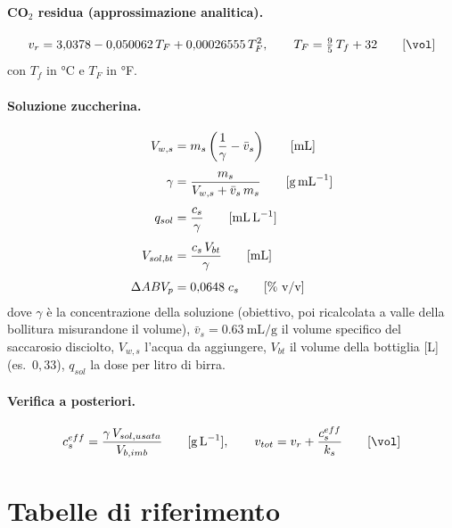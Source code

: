 \paragraph{CO$_2$ residua (approssimazione analitica).}
\begin{equation}
v_r = 3{,}0378 - 0{,}050062\,T_F + 0{,}00026555\,T_F^2, \qquad T_F = \tfrac{9}{5}\,T_f + 32 \un{\si{\vol}}
\end{equation}
con $T_f$ in \si{\celsius} e $T_F$ in \si{\degree}F.

\paragraph{Soluzione zuccherina.}
\begin{align}
V_{w,s} &= m_s\left(\frac{1}{\gamma} - \bar v_s\right) \qquad [\si{\milli\liter}] \\[4pt]
\gamma &= \frac{m_s}{V_{w,s} + \bar v_s\, m_s} \qquad [\si{\gram\per\milli\liter}] \\[4pt]
q_{sol} &= \frac{c_s}{\gamma} \qquad [\si{\milli\liter\per\liter}] \\[4pt]
V_{sol,bt} &= \frac{c_s\, V_{bt}}{\gamma} \qquad [\si{\milli\liter}] \\[4pt]
\Delta ABV_{p} &= 0{,}0648\; c_s \qquad [\si{\percent} \text{ v/v}]
\end{align}
dove $\gamma$ è la concentrazione della soluzione (obiettivo, poi ricalcolata a valle della bollitura misurandone il volume), $\bar v_s = \SI{0,63}{\milli\liter\per\gram}$ il volume specifico del saccarosio disciolto, $V_{w,s}$ l'acqua da aggiungere, $V_{bt}$ il volume della bottiglia [\si{\liter}] (es.\ $0{,}33$), $q_{sol}$ la dose per litro di birra.

\paragraph{Verifica a posteriori.}
\begin{equation}
c_s^{eff} = \frac{\gamma\, V_{sol,usata}}{V_{b,imb}} \un{\si{\gram\per\liter}}, \qquad
v_{tot} = v_r + \frac{c_s^{eff}}{k_s} \un{\si{\vol}}
\end{equation}

\clearpage
\section*{Tabelle di riferimento}

